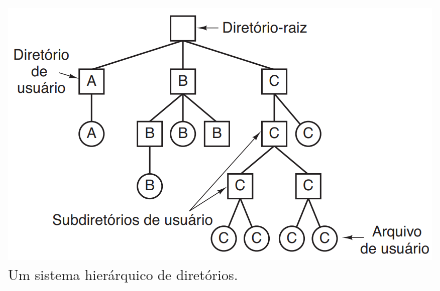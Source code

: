 \begin{figure}[htpb]
    \centering
   \includegraphics[scale=0.7]{imagens/DiretorioRaiz2.png}
   \caption{Um sistema hierárquico de diretórios. \cite{Tanenbaum2016}}
   \label{fig:DiretorioRaiz2}
\end{figure} 

